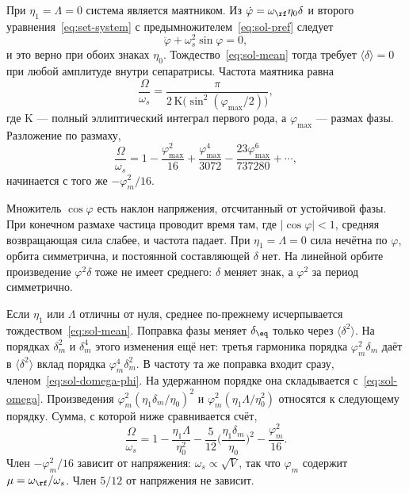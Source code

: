 При $\eta_1=\Lambda=0$ система является маятником. Из $\dot\varphi=\omega_\rf\eta_0\delta$ и второго уравнения~\eqref{eq:set-system} с предымножителем~\eqref{eq:sol-pref} следует
\begin{equation}
\label{eq:sol-pendulum}
\ddot\varphi+\omega_s^2\sin\varphi=0,
\end{equation}
и это верно при обоих знаках $\eta_0$. Тождество~\eqref{eq:sol-mean} тогда требует $\langle\delta\rangle=0$ при любой амплитуде внутри сепаратрисы. Частота маятника равна
\begin{equation}
\label{eq:sol-pend-exact}
\frac{\Omega}{\omega_s}
=\frac{\pi}{2\,\mathrm{K}\bigl(\sin^2(\varphi_{\max}/2)\bigr)},
\end{equation}
где $\mathrm{K}$ --- полный эллиптический интеграл первого рода, а $\varphi_{\max}$ --- размах фазы. Разложение по размаху,
\begin{equation}
\label{eq:sol-pend-series}
\frac{\Omega}{\omega_s}
=1
-\frac{\varphi_{\max}^2}{16}
+\frac{\varphi_{\max}^4}{3072}
-\frac{23\varphi_{\max}^6}{737280}
+\cdots,
\end{equation}
начинается с того же $-\varphi_m^2/16$.

Множитель $\cos\varphi$ есть наклон напряжения, отсчитанный от устойчивой фазы. При конечном размахе частица проводит время там, где $|\cos\varphi|<1$, средняя возвращающая сила слабее, и частота падает. При $\eta_1=\Lambda=0$ сила нечётна по $\varphi$, орбита симметрична, и постоянной составляющей $\delta$ нет. На линейной орбите произведение $\varphi^2\delta$ тоже не имеет среднего: $\delta$ меняет знак, а $\varphi^2$ за период симметрично.

Если $\eta_1$ или $\Lambda$ отличны от нуля, среднее по-прежнему исчерпывается тождеством~\eqref{eq:sol-mean}. Поправка фазы меняет $\delta_\eq$ только через $\langle\delta^2\rangle$. На порядках $\delta_m^2$ и $\delta_m^4$ этого изменения ещё нет: третья гармоника порядка $\varphi_m^2\delta_m$ даёт в $\langle\delta^2\rangle$ вклад порядка $\varphi_m^4\delta_m^2$. В частоту та же поправка входит сразу, членом~\eqref{eq:sol-domega-phi}. На удержанном порядке она складывается с~\eqref{eq:sol-omega}. Произведения $\varphi_m^2(\eta_1\delta_m/\eta_0)^2$ и $\varphi_m^2(\eta_1\Lambda/\eta_0^2)$ относятся к следующему порядку. Сумма, с которой ниже сравнивается счёт,
\begin{equation}
\label{eq:sol-omega-sum}
\frac{\Omega}{\omega_s}
=1
-\frac{\eta_1\Lambda}{\eta_0^2}
-\frac{5}{12}
\Biggl(\frac{\eta_1\delta_m}{\eta_0}\Biggr)^2
-\frac{\varphi_m^2}{16}.
\end{equation}
Член $-\varphi_m^2/16$ зависит от напряжения: $\omega_s\propto\sqrt{V}$, так что $\varphi_m$ содержит $\mu=\omega_\rf/\omega_s$. Член $5/12$ от напряжения не зависит.

